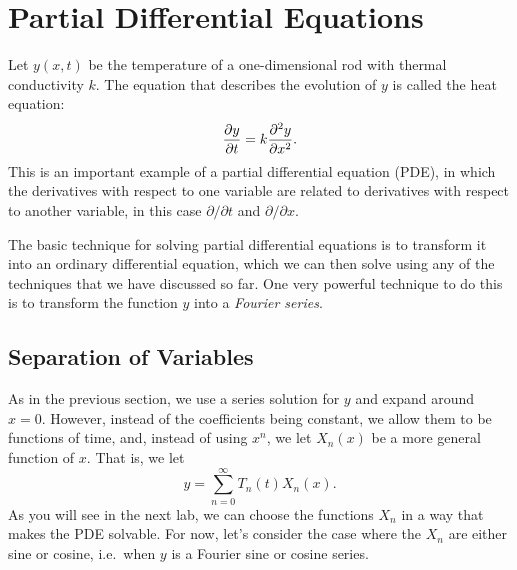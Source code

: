 \documentclass[12pt]{book}
\begin{document}
\chapter{Partial Differential Equations}
Let $y(x,t)$ be the temperature of a one-dimensional rod with thermal
conductivity $k$. The equation that describes the evolution of $y$ is
called the heat equation:
\begin{dmath*}
  \pp{y}{t} =  k\pptwo{y}{x}.
\end{dmath*}
This is an important example of a partial differential equation (PDE), in which
the derivatives with respect to one variable are related to derivatives with
respect to another variable, in this case $\partial/\partial t$ and
$\partial/\partial x$.

The basic technique for solving partial differential equations is to
transform it into an ordinary differential equation, which we can then
solve using any of the techniques that we have discussed so far. One
very powerful technique to do this is to transform the function $y$
into a \emph{Fourier series}.

\section{Separation of Variables}
As in the previous section, we use a series solution for $y$ and
expand around $x=0$. However, instead of the coefficients being
constant, we allow them to be functions of time, and, instead of using
$x^n$, we let $X_n(x)$ be a more general function of $x$. That is, we
let
\begin{dmath*}
  \boxed{y = \sum_{n=0}^\infty T_n(t) X_n(x)}.
\end{dmath*}
As you will see in the next lab, we can choose the functions $X_n$ in
a way that makes the PDE solvable. For now, let's consider the case
where the $X_n$ are either sine or cosine, i.e.\ when $y$ is a Fourier
sine or cosine series.
\end{document}

